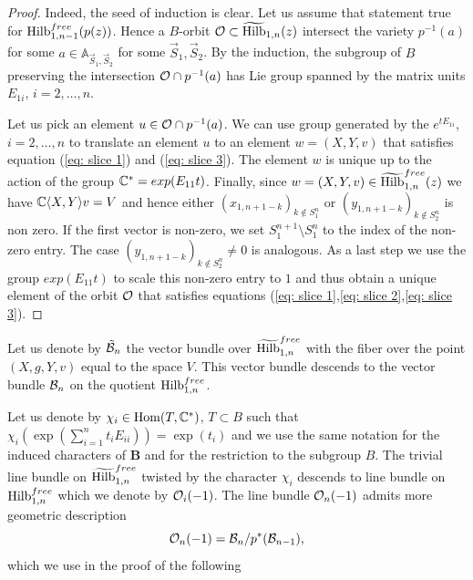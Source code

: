 \documentclass[10pt]{amsart}
\begin{document}
\begin{proof}
Indeed, the seed of induction is clear. Let us assume that statement true for $\mathrm{Hilb}^{free}_{1,n-1}(p(z))$. Hence a $B$-orbit $\mathcal{O}\subset\widetilde{\mathrm{Hilb}}_{1,n}(z)$ intersect  the variety
$p^{-1}(a)$ for some $a\in \mathbb{A}_{\vec{S}_1,\vec{S}_2}$ for some $\vec{S}_1, \vec{S}_2$.   By the induction, the subgroup of $B$ preserving the intersection
$\mathcal{O}\cap p^{-1}(a)$ has Lie group spanned by the matrix units $E_{1i}$, $i=2,\dots,n$.

 Let us pick an element $u\in \mathcal{O}\cap p^{-1}(a)$.  We can use group generated by the
$e^{tE_{1i}}$, $i=2,\dots,n$ to translate an element $u$ to an element $w=(X,Y,v)$ that satisfies equation (\ref{eq: slice 1}) and (\ref{eq: slice 3}). The element $w$ is unique up to the
action of the group $\mathbb{C}^*=exp(E_{11}t)$. Finally, since $w=(X,Y,v)\in \widetilde{\mathrm{Hilb}}^{free}_{1,n}(z)$ we have $\mathbb{C}\langle X,Y\rangle v=V$ and
hence either $(x_{1,n+1-k})_{k\notin S^n_1}$ or $(y_{1,n+1-k})_{k\notin S^n_2}$ is non zero. If the first vector is non-zero, we set $S_1^{n+1}\setminus S_1^n$ to the index of the non-zero entry.
The case $(y_{1,n+1-k})_{k\notin S^n_2}\ne 0$ is analogous. As a last step we use the group $exp(E_{11}t)$ to scale this non-zero entry to $1$ and thus
obtain a unique element of the orbit $\mathcal{O}$ that satisfies equations (\ref{eq: slice 1},\ref{eq: slice 2},\ref{eq: slice 3}).
\end{proof}

Let us denote by $\tilde{\mathcal{B}}_n$ the  vector bundle over $\widetilde{\mathrm{Hilb}}^{free}_{1,n}$  with the fiber over the point $(X,g,Y,v)$ equal to the space $V$.
This vector bundle descends to the vector bundle $\mathcal{B}_n$ on the quotient $\mathrm{Hilb}^{free}_{1,n}$.

Let us denote by $\chi_i\in \mathop{{\rm Hom}}\nolimits(T,\mathbb{C}^*)$, $T\subset B$  such that $\chi_i(\exp(\sum_{i=1}^n t_i E_{ii}))=\exp(t_i)$ and we use the same notation for
the induced characters of $\mathbf{B}$ and for the restriction to the subgroup $B$. The trivial line bundle on $\widetilde{\mathrm{Hilb}}_{1,n}^{free}$ twisted by the character $\chi_i$
descends to line bundle on $\mathrm{Hilb}_{1,n}^{free}$ which we denote by $\mathcal{O}_i(-1)$. The line bundle $\mathcal{O}_n(-1)$ admits more geometric description
$$ \mathcal{O}_n(-1)=\mathcal{B}_n /p^*(\mathcal{B}_{n-1}),$$
which we use in the proof of the following
\end{document}
